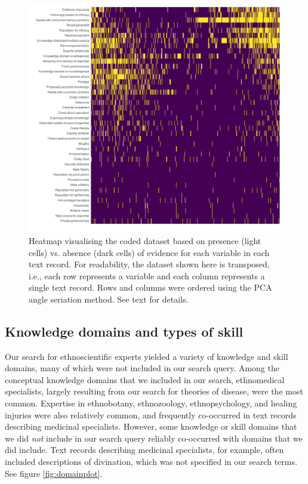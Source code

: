 \documentclass[
  11pt,
]{article}
\begin{document}
\begin{figure}

{\centering \includegraphics{conceptual-experts-paper_files/figure-latex/heatPCA-1} 

}

\caption{Heatmap visualising the coded dataset based on presence (light cells) vs. absence (dark cells) of evidence for each variable in each text record. For readability, the dataset shown here is transposed, i.e., each row represents a variable and each column represents a single text record. Rows and columns were ordered using the PCA angle seriation method. See text for details.}\label{fig:heatPCA}
\end{figure}

\hypertarget{knowledge-domains-and-types-of-skill}{%
\subsection{Knowledge domains and types of skill}\label{knowledge-domains-and-types-of-skill}}

Our search for ethnoscientific experts yielded a variety of knowledge and skill domains, many of which were not included in our search query. Among the conceptual knowledge domains that we included in our search, ethnomedical specialists, largely resulting from our search for theories of disease, were the most common. Expertise in ethnobotany, ethnozoology, ethnopsychology, and healing injuries were also relatively common, and frequently co-occurred in text records describing medicinal specialists. However, some knowledge or skill domains that we did \emph{not} include in our search query reliably co-occurred with domains that we did include. Text records describing medicinal specialists, for example, often included descriptions of divination, which was not specified in our search terms. See figure \ref{fig:domainplot}.
\end{document}
